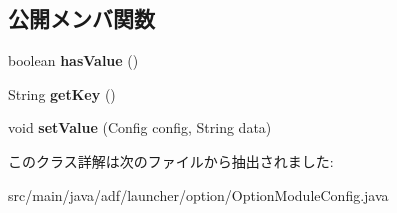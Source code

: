 \subsection*{公開メンバ関数}
\begin{DoxyCompactItemize}
\item 
\hypertarget{classadf_1_1launcher_1_1option_1_1OptionModuleConfig_ac696a4a43153d93af5bbe8312fba5e45}{}\label{classadf_1_1launcher_1_1option_1_1OptionModuleConfig_ac696a4a43153d93af5bbe8312fba5e45} 
boolean {\bfseries has\+Value} ()
\item 
\hypertarget{classadf_1_1launcher_1_1option_1_1OptionModuleConfig_a421cca732c2a3828916610e7a14a66f0}{}\label{classadf_1_1launcher_1_1option_1_1OptionModuleConfig_a421cca732c2a3828916610e7a14a66f0} 
String {\bfseries get\+Key} ()
\item 
\hypertarget{classadf_1_1launcher_1_1option_1_1OptionModuleConfig_a1fbd650a37912f7dddb8b99e616113e9}{}\label{classadf_1_1launcher_1_1option_1_1OptionModuleConfig_a1fbd650a37912f7dddb8b99e616113e9} 
void {\bfseries set\+Value} (Config config, String data)
\end{DoxyCompactItemize}


このクラス詳解は次のファイルから抽出されました\+:\begin{DoxyCompactItemize}
\item 
src/main/java/adf/launcher/option/Option\+Module\+Config.\+java\end{DoxyCompactItemize}
